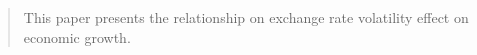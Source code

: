 \begin{abstract}
This paper presents the relationship on exchange rate volatility effect on economic growth.



    
\end{abstract}